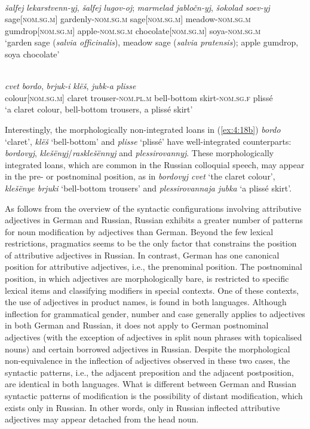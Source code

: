 \ea
\ea{\label{ex:4:18a}}
\citep[203]{rusgramm-tom2}\\
\gll \textit{šalfej} \textit{lekarstvenn-yj}, \textit{šalfej} \textit{lugov-oj}; \textit{marmelad} \textit{jabločn-yj}, \textit{šokolad} \textit{soev-yj}\\
	sage[\textsc{nom.sg.m}] gardenly-\textsc{nom.sg.m} sage[\textsc{nom.sg.m}] meadow-\textsc{nom.sg.m} gumdrop[\textsc{nom.sg.m}] apple-\textsc{nom.sg.m} chocolate[\textsc{nom.sg.m}] soya-\textsc{nom.sg.m}\\
\glt `garden sage (\textit{salvia officinalis}), meadow sage (\textit{salvia pratensis}); apple gumdrop, soya chocolate'

\ex{\label{ex:4:18b}}
\citep[540]{rusgramm-tom1}\\
\gll \textit{cvet} \textit{bordo}, \textit{brjuk-i} \textit{klëš}, \textit{jubk-a} \textit{plisse}\\
	colour[\textsc{nom.sg.m}] claret trouser-\textsc{nom.pl.m} bell-bottom skirt-\textsc{nom.sg.f} plissé\\
\glt `a claret colour, bell-bottom trousers, a plissé skirt'
\z
\z

\noindent Interestingly, the morphologically non-integrated loans in (\ref{ex:4:18b}) \textit{bordo} `claret', \textit{klëš} `bell-bottom' and \textit{plisse} `plissé' have well-integrated counterparts: \textit{bordovyj}, \textit{klešënyj}\slash\textit{rasklešënnyj} and \textit{plessirovannyj}. These morphologically integrated loans, which are common in the Russian colloquial speech, may appear in the pre- or postnominal position,  as in \textit{bordovyj cvet} `the claret colour', \textit{klešënye brjuki} `bell-bottom trousers' and \textit{plessirovannaja jubka} `a plissé skirt'.

As follows from the overview of the syntactic configurations involving attributive adjectives in German and Russian, Russian exhibits a greater number of patterns for noun modification by adjectives than German. Beyond the few lexical restrictions, pragmatics seems to be the only factor that constrains the position of attributive adjectives in Russian. In contrast, German has one canonical position for attributive adjectives, i.e., the prenominal position. The postnominal position, in which adjectives are morphologically bare, is restricted to specific lexical items and classifying modifiers in special contexts. One of these contexts, the use of adjectives in product names, is found in both languages. Although inflection for grammatical gender, number and case generally applies to adjectives in both German and Russian, it does not apply to German postnominal adjectives (with the exception of adjectives in split noun phrases with topicalised nouns) and certain borrowed adjectives in Russian. Despite the morphological non-equivalence in the inflection of adjectives observed in these two cases, the syntactic patterns, i.e., the adjacent preposition and the adjacent postposition, are identical in both languages. What is different between German and Russian syntactic patterns of modification is the possibility of distant modification, which exists only in Russian. In other words, only in Russian inflected attributive adjectives may appear detached from the head noun.

